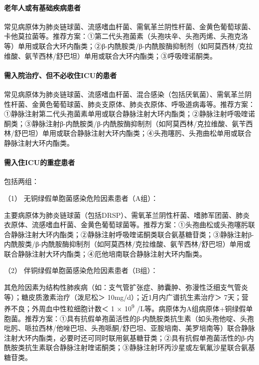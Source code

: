 \paragraph{老年人或有基础疾病患者}

常见病原体为肺炎链球菌、流感嗜血杆菌、需氧革兰阴性杆菌、金黄色葡萄球菌、卡他莫拉菌等。推荐方案：①第二代头孢菌素（头孢呋辛、头孢丙烯、头孢克洛等）单用或联合大环内酯类；②β-内酰胺类/β-内酰胺酶抑制剂（如阿莫西林/克拉维酸、氨苄西林/舒巴坦）单用或联合大环内酯类；③呼吸喹诺酮类。

\paragraph{需入院治疗、但不必收住ICU的患者}

常见病原体为肺炎链球菌、流感嗜血杆菌、混合感染（包括厌氧菌）、需氧革兰阴性杆菌、金黄色葡萄球菌、肺炎支原体、肺炎衣原体、呼吸道病毒等。推荐方案：①静脉注射第二代头孢菌素单用或联合静脉注射大环内酯类；②静脉注射呼吸喹诺酮类；③静脉注射β-内酰胺类/β-内酰胺酶抑制剂（如阿莫西林/克拉维酸、氨苄西林/舒巴坦）单用或联合静脉注射大环内酯类；④头孢噻肟、头孢曲松单用或联合静脉注射大环内酯类。

\paragraph{需入住ICU的重症患者}

包括两组：

\hypertarget{text00272.htmlux5cux23CHP9-5-3-2-4-1}{}
（1） 无铜绿假单胞菌感染危险因素患者（A组）：

主要病原体为肺炎链球菌（包括DRSP）、需氧革兰阴性杆菌、嗜肺军团菌、肺炎衣原体、流感嗜血杆菌、金黄色葡萄球菌等。推荐方案：①头孢曲松或头孢噻肟联合静脉注射大环内酯类；②静脉注射呼吸喹诺酮类联合氨基糖苷类；③静脉注射β-内酰胺类/β-内酰胺酶抑制剂（如阿莫西林/克拉维酸、氨苄西林/舒巴坦）单用或联合静脉注射大环内酯类；④厄他培南联合静脉注射大环内酯类。

\hypertarget{text00272.htmlux5cux23CHP9-5-3-2-4-2}{}
（2） 伴铜绿假单胞菌感染危险因素患者（B组）：

其危险因素为结构性肺疾病（如：支气管扩张症、肺囊肿、弥漫性泛细支气管炎等）；糖皮质激素治疗（泼尼松＞
10mg/d）；近1月内广谱抗生素治疗＞ 7天；营养不良；外周血中性粒细胞计数＜
1 × 10\textsuperscript{9}
/L等。病原体为A组病原体+铜绿假单胞菌。推荐方案：①具有抗假单孢菌活性的β-内酰胺类抗生素（如头孢他啶、头孢吡肟、哌拉西林/他唑巴坦、头孢哌酮/舒巴坦、亚胺培南、美罗培南等）联合静脉注射大环内酯类，必要时还可同时联用氨基糖苷类；②具有抗假单孢菌活性的β-内酰胺类抗生素联合静脉注射喹诺酮类；③静脉注射环丙沙星或左氧氟沙星联合氨基糖苷类。

